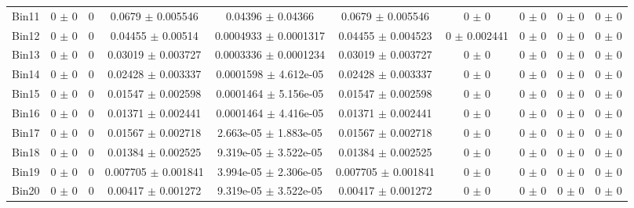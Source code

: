 \begin{tabular}{@{\extracolsep{4pt}}lccccccccc@{}}
     Bin11 & 0 $\pm$ 0 & 0 & 0.0679 $\pm$ 0.005546 & 0.04396 $\pm$ 0.04366 & 0.0679 $\pm$ 0.005546 & 0 $\pm$ 0 & 0 $\pm$ 0 & 0 $\pm$ 0 & 0 $\pm$ 0 \\ 
     Bin12 & 0 $\pm$ 0 & 0 & 0.04455 $\pm$ 0.00514 & 0.0004933 $\pm$ 0.0001317 & 0.04455 $\pm$ 0.004523 & 0 $\pm$ 0.002441 & 0 $\pm$ 0 & 0 $\pm$ 0 & 0 $\pm$ 0 \\ 
     Bin13 & 0 $\pm$ 0 & 0 & 0.03019 $\pm$ 0.003727 & 0.0003336 $\pm$ 0.0001234 & 0.03019 $\pm$ 0.003727 & 0 $\pm$ 0 & 0 $\pm$ 0 & 0 $\pm$ 0 & 0 $\pm$ 0 \\ 
     Bin14 & 0 $\pm$ 0 & 0 & 0.02428 $\pm$ 0.003337 & 0.0001598 $\pm$ 4.612e-05 & 0.02428 $\pm$ 0.003337 & 0 $\pm$ 0 & 0 $\pm$ 0 & 0 $\pm$ 0 & 0 $\pm$ 0 \\ 
     Bin15 & 0 $\pm$ 0 & 0 & 0.01547 $\pm$ 0.002598 & 0.0001464 $\pm$ 5.156e-05 & 0.01547 $\pm$ 0.002598 & 0 $\pm$ 0 & 0 $\pm$ 0 & 0 $\pm$ 0 & 0 $\pm$ 0 \\ 
     Bin16 & 0 $\pm$ 0 & 0 & 0.01371 $\pm$ 0.002441 & 0.0001464 $\pm$ 4.416e-05 & 0.01371 $\pm$ 0.002441 & 0 $\pm$ 0 & 0 $\pm$ 0 & 0 $\pm$ 0 & 0 $\pm$ 0 \\ 
     Bin17 & 0 $\pm$ 0 & 0 & 0.01567 $\pm$ 0.002718 & 2.663e-05 $\pm$ 1.883e-05 & 0.01567 $\pm$ 0.002718 & 0 $\pm$ 0 & 0 $\pm$ 0 & 0 $\pm$ 0 & 0 $\pm$ 0 \\ 
     Bin18 & 0 $\pm$ 0 & 0 & 0.01384 $\pm$ 0.002525 & 9.319e-05 $\pm$ 3.522e-05 & 0.01384 $\pm$ 0.002525 & 0 $\pm$ 0 & 0 $\pm$ 0 & 0 $\pm$ 0 & 0 $\pm$ 0 \\ 
     Bin19 & 0 $\pm$ 0 & 0 & 0.007705 $\pm$ 0.001841 & 3.994e-05 $\pm$ 2.306e-05 & 0.007705 $\pm$ 0.001841 & 0 $\pm$ 0 & 0 $\pm$ 0 & 0 $\pm$ 0 & 0 $\pm$ 0 \\ 
     Bin20 & 0 $\pm$ 0 & 0 & 0.00417 $\pm$ 0.001272 & 9.319e-05 $\pm$ 3.522e-05 & 0.00417 $\pm$ 0.001272 & 0 $\pm$ 0 & 0 $\pm$ 0 & 0 $\pm$ 0 & 0 $\pm$ 0 \\ 
\hline\hline
  \end{tabular}
